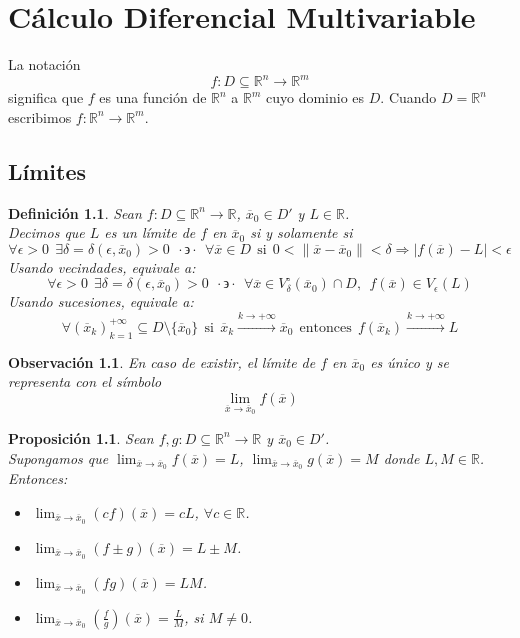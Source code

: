 \documentclass[11pt]{report}
\newtheorem{definition}{Definición}[section]
\newtheorem{observation}{Observación}[section]
\newtheorem{proposition}{Proposición}[section]
\newcommand{\Rn}{\mathbb{R}^{n}}
\newcommand{\Rm}{\mathbb{R}^{m}}
\newcommand{\R}{\mathbb{R}}
\newcommand{\x}{\overline{x}}
\newcommand{\xz}{\overline{x}_{0}}
\newcommand{\tq}{\cdot\backepsilon\cdot}
\begin{document}
\chapter{Cálculo Diferencial Multivariable}
La notación 
$$f:D\subseteq\Rn\rightarrow\Rm$$
significa que $f$ es una función de $\Rn$ a $\Rm$ cuyo dominio es $D$. Cuando $D=\Rn$ escribimos $f:\Rn\rightarrow\Rm$.

\section{Límites}

\begin{definition} Sean $f:D\subseteq\Rn\rightarrow\R$, $\xz\in D'$ y $L\in\R$.\\
Decimos que $L$ es un límite de $f$ en $\xz$ si y solamente si
$$\forall\epsilon>0\ \ \exists\delta=\delta(\epsilon, \xz)>0\ \ \tq\ \ \forall\x\in D\ \ \text{si}\ \ 0<\| \x-\xz \|<\delta\Rightarrow|f(\x)-L|<\epsilon$$
Usando vecindades, equivale a:
$$\forall\epsilon>0\ \ \exists\delta=\delta(\epsilon, \xz)>0\ \ \tq\ \ \forall\x\in V_{\delta}^{\circ}(\xz)\cap D,\ \ f(\x)\in V_{\epsilon}(L)$$
Usando sucesiones, equivale a:
$$\forall(\x_{k})_{k=1}^{+\infty}\subseteq D\setminus\{\xz\}\ \ \text{si}\ \ \x_{k}\xrightarrow{k\rightarrow+\infty}\xz\ \ \text{entonces}\ \ f(\x_{k})\xrightarrow{k\rightarrow+\infty}L$$
\end{definition}

\begin{observation}
En caso de existir, el límite de $f$ en $\xz$ es único y se representa con el símbolo
$$\lim_{\x\to\xz}f(\x)$$
\end{observation}

\begin{proposition}
Sean $f, g:D\subseteq\Rn\rightarrow\R$ y $\xz\in D'$.\\
Supongamos que $\lim_{\x\to\xz}f(\x)=L$, $\lim_{\x\to\xz}g(\x)=M$ donde $L, M\in\R$. Entonces:
\begin{itemize}
\item[(i)] $\lim_{\x\to\xz}(cf)(\x)=cL$, $\forall c\in\R$.
\item[(ii)] $\lim_{\x\to\xz}(f\pm g)(\x)=L\pm M$.
\item[(iii)] $\lim_{\x\to\xz}(fg)(\x)=LM$.
\item[(iv)] $\lim_{\x\to\xz}\left(\frac{f}{g}\right)(\x)=\frac{L}{M}$, si $M\ne0$.
\end{itemize}
\end{proposition}
\end{document}
